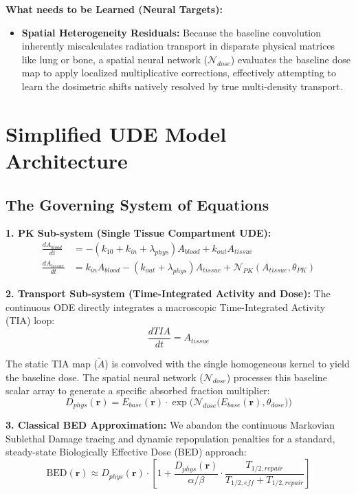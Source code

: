 \documentclass[11pt,a4paper]{article}
\begin{document}
\textbf{What needs to be Learned (Neural Targets):}
\begin{itemize}
    \item \textbf{Spatial Heterogeneity Residuals:} Because the baseline convolution inherently miscalculates radiation transport in disparate physical matrices like lung or bone, a spatial neural network ($\mathcal{N}_{dose}$) evaluates the baseline dose map to apply localized multiplicative corrections, effectively attempting to learn the dosimetric shifts natively resolved by true multi-density transport.
\end{itemize}

\section{Simplified UDE Model Architecture}

\subsection{The Governing System of Equations}
\textbf{1. PK Sub-system (Single Tissue Compartment UDE):}
\begin{align}
    \frac{dA_{blood}}{dt} &= -(k_{10} + k_{in} + \lambda_{phys}) A_{blood} + k_{out} A_{tissue} \\
    \frac{dA_{tissue}}{dt} &= k_{in} A_{blood} - (k_{out} + \lambda_{phys}) A_{tissue} + \mathcal{N}_{PK}(A_{tissue}, \theta_{PK})
\end{align}

\textbf{2. Transport Sub-system (Time-Integrated Activity and Dose):}
The continuous ODE directly integrates a macroscopic Time-Integrated Activity (TIA) loop:
\begin{equation}
    \frac{dTIA}{dt} = A_{tissue}
\end{equation}

The static TIA map ($\tilde{A}$) is convolved with the single homogeneous kernel to yield the baseline dose. The spatial neural network ($\mathcal{N}_{dose}$) processes this baseline scalar array to generate a specific absorbed fraction multiplier:
\begin{equation}
    D_{phys}(\mathbf{r}) = E_{base}(\mathbf{r}) \cdot \exp \Big(\mathcal{N}_{dose} \big(E_{base}(\mathbf{r}), \theta_{dose}\big)\Big)
\end{equation}

\textbf{3. Classical BED Approximation:}
We abandon the continuous Markovian Sublethal Damage tracing and dynamic repopulation penalties for a standard, steady-state Biologically Effective Dose (BED) approach:
\begin{equation}
    \text{BED}(\mathbf{r}) \approx D_{phys}(\mathbf{r}) \cdot \left[ 1 + \frac{D_{phys}(\mathbf{r})}{\alpha/\beta} \cdot \frac{T_{1/2, repair}}{T_{1/2, eff} + T_{1/2, repair}} \right]
\end{equation}
\end{document}
